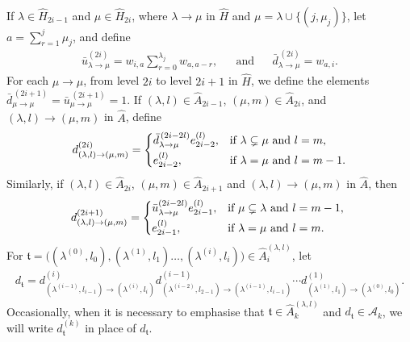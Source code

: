 \documentclass[11pt,a4paper,reqno,svgnames]{amsart}
\theoremstyle{plain}
\theoremstyle{definition}
\numberwithin{equation}{section}
\begin{document}
If $\lambda\in\widehat{H}_{2i-1}$ and $\mu\in\widehat{H}_{2i}$, where $\lambda\to\mu$ in $\widehat{H}$ and $\mu=\lambda\cup\lbrace(j,\mu_j)\rbrace$, let $a=\sum_{r=1}^{j}\mu_j$, and define
\begin{align*}
\bar{u}_{\lambda\to\mu}^{(2i)}=w_{i,a}\sum_{r=0}^{\lambda_j} w_{a,a-r}, && \text{and} && \bar{d}_{\lambda\to\mu}^{\,(2i)}=w_{a,i}. 
\end{align*}
For each $\mu\to\mu$, from level $2i$ to level $2i+1$ in $\widehat{H}$, we define the elements $\bar{d}^{\,(2i+1)}_{\mu\to\mu}=\bar{u}^{\,(2i+1)}_{\mu\to\mu}=1$. 
If $(\lambda,l)\in\hat{A}_{2i-1}$, $(\mu,m)\in\hat{A}_{2i}$, and $(\lambda,l)\to(\mu,m)$ in $\hat{A}$, define 
\begin{align*}
d_{(\lambda,l)\to(\mu,m)}^{(2i)}=
\begin{cases}
\bar{d}_{\lambda\to\mu}^{\,(2i-2l)}e_{2i-2}^{(l)},&\text{if $\lambda\subsetneq\mu$ and $l=m$, }\vspace{3pt}\\
e_{2i-2}^{(l)},&\text{if $\lambda=\mu$ and $l=m-1$.}
\end{cases}
\end{align*}
Similarly, if $(\lambda,l)\in\hat{A}_{2i}$, $(\mu,m)\in\hat{A}_{2i+1}$ and $(\lambda,l)\to(\mu,m)$ in $\hat{A}$, then 
\begin{align*}
d_{(\lambda,l)\to(\mu,m)}^{(2i+1)}=
\begin{cases}
\bar{u}_{\lambda\to\mu}^{(2i-2l)}e_{2i-1}^{(l)},&\text{if $\mu\subsetneq\lambda$ and $l=m-1$, }\vspace{3pt}\\
e_{2i-1}^{(l)},&\text{if $\lambda=\mu$ and $l=m$.}
\end{cases}
\end{align*}
For $\mathfrak{t}=\big( (\lambda^{(0)},l_0),(\lambda^{(1)},l_1)\ldots,(\lambda^{(i)},l_i))\in\hat{A}_{i}^{(\lambda,l)}$, let 
\begin{align*}
d_\mathfrak{t}= d_{(\lambda^{(i-1)},l_{i-1})\to (\lambda^{(i)},l_i)}^{(i)}d_{(\lambda^{(i-2)},l_{2-1})\to (\lambda^{(i-1)},l_{i-1})}^{(i-1)}\cdots d_{(\lambda^{(1)},l_{1})\to (\lambda^{(0)},l_{0})}^{(1)}.
\end{align*}
Occasionally, when it is necessary to emphasise that  $\mathfrak{t}\in\hat{A}_k^{(\lambda,l)}$ and $d_\mathfrak{t}\in \mathcal{A}_k$, we will write $d^{(k)}_\mathfrak{t}$ in place of $d_\mathfrak{t}$. 
\end{document}
